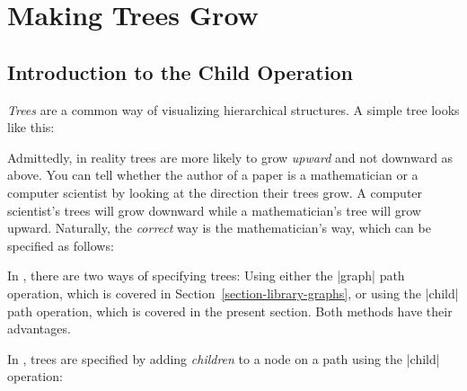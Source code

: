 %
%
%


\section[tikz-trees]{Making Trees Grow}
\label{section-trees}

\subsection{Introduction to the  Child Operation}

\emph{Trees} are a common way of visualizing hierarchical structures. A simple
tree looks like this:
%
\begin{codeexample}[]
\end{codeexample}

Admittedly, in reality trees are more likely to grow \emph{upward} and not
downward as above. You can tell whether the author of a paper is a
mathematician or a computer scientist by looking at the direction their trees
grow. A computer scientist's trees will grow downward while a mathematician's
tree will grow upward. Naturally, the \emph{correct} way is the mathematician's
way, which can be specified as follows:
%
\begin{codeexample}[]
\end{codeexample}

In \tikzname, there are two ways of specifying trees: Using either the |graph|
path operation, which is covered in Section~\ref{section-library-graphs}, or
using the |child| path operation, which is covered in the present section. Both
methods have their advantages.

In \tikzname, trees are specified by adding \emph{children} to a node on a path
using the |child| operation:

